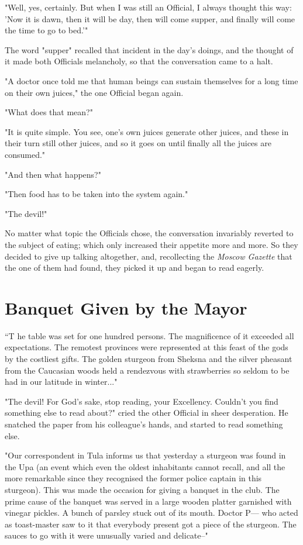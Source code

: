 "Well, yes, certainly. But when I was still an Official, I always
thought this way: 'Now it is dawn, then it will be day, then will
come supper, and finally will come the time to go to bed.'"

The word "supper" recalled that incident in the day's doings, and the
thought of it made both Officials melancholy, so that the conversation
came to a halt.

"A doctor once told me that human beings can sustain themselves for a
long time on their own juices," the one Official began again.

"What does that mean?"

"It is quite simple. You see, one's own juices generate other juices,
and these in their turn still other juices, and so it goes on until
finally all the juices are consumed."

"And then what happens?"

"Then food has to be taken into the system again."

"The devil!"

No matter what topic the Officials chose, the conversation invariably
reverted to the subject of eating; which only increased their appetite
more and more. So they decided to give up talking altogether, and,
recollecting the \emph{Moscow Gazette} that the one of them had found, they
picked it up and began to read eagerly.


\section{Banquet Given by the Mayor}

\lettrine[lines=3,lhang=0.11,lraise=0,loversize=0.05]{``T}{}%
he table was set for one hundred persons. The magnificence of it
exceeded all expectations. The remotest provinces were represented at
this feast of the gods by the costliest gifts. The golden sturgeon
from Sheksna and the silver pheasant from the Caucasian woods held a
rendezvous with strawberries so seldom to be had in our latitude in
winter..."

"The devil! For God's sake, stop reading, your Excellency. Couldn't
you find something else to read about?" cried the other Official in
sheer desperation. He snatched the paper from his colleague's hands,
and started to read something else.

"Our correspondent in Tula informs us that yesterday a sturgeon was
found in the Upa (an event which even the oldest inhabitants cannot
recall, and all the more remarkable since they recognised the former
police captain in this sturgeon). This was made the occasion for
giving a banquet in the club. The prime cause of the banquet was
served in a large wooden platter garnished with vinegar pickles. A
bunch of parsley stuck out of its mouth. Doctor P--- who acted as
toast-master saw to it that everybody present got a piece of the
sturgeon. The sauces to go with it were unusually varied and
delicate--"

